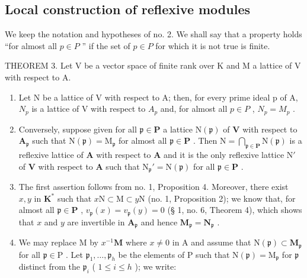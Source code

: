 \subsection{Local construction of reflexive modules}

We keep the notation and hypotheses of no. 2. We shall say that a property holds ``for almost all \(p \in P\) '' if the set of \(p \in P\) for which it is not true is finite.

THEOREM 3. Let V be a vector space of finite rank over K and M a lattice of V with respect to A.

\begin{enumerate}
\def\labelenumi{(\roman{enumi})}
\item
  Let N be a lattice of V with respect to A; then, for every prime ideal p of A, \(N_{p}\) is a lattice of V with respect to \(A_{p}\) and, for almost all \(p \in P\) , \(N_{p} = M_{p}\) .
\item
  Conversely, suppose given for all \(\mathfrak{p} \in \mathbf{P}\) a lattice \(\mathrm{N}(\mathfrak{p})\) of \(\mathbf{V}\) with respect to \(\mathbf{A}_{\mathfrak{p}}\) such that \(\mathrm{N}(\mathfrak{p}) = \mathrm{M}_{\mathfrak{p}}\) for almost all \(\mathfrak{p} \in \mathbf{P}\) . Then \(\mathrm{N} = \bigcap_{\mathfrak{p} \in \mathbf{P}} \mathrm{N}(\mathfrak{p})\) is a reflexive lattice of \(\mathbf{A}\) with respect to \(\mathbf{A}\) and it is the only reflexive lattice \(\mathrm{N}'\) of \(\mathbf{V}\) with respect to \(\mathbf{A}\) such that \(\mathrm{N}_{\mathfrak{p}}' = \mathrm{N}(\mathfrak{p})\) for all \(\mathfrak{p} \in \mathbf{P}\) .
\item
  The first assertion follows from no. 1, Proposition 4. Moreover, there exist \(x, y\) in \(\mathbf{K}^*\) such that \(x\mathrm{N} \subset \mathrm{M} \subset y\mathrm{N}\) (no. 1, Proposition 2); we know that, for almost all \(\mathfrak{p} \in \mathbf{P}\) , \(v_{\mathfrak{p}}(x) = v_{\mathfrak{p}}(y) = 0\) (§ 1, no. 6, Theorem 4), which shows that \(x\) and \(y\) are invertible in \(\mathbf{A}_{\mathfrak{p}}\) and hence \(\mathbf{M}_{\mathfrak{p}} = \mathbf{N}_{\mathfrak{p}}\) .
\item
  We may replace M by \(x^{-1}\mathbf{M}\) where \(x \neq 0\) in A and assume that \(\mathrm{N}(\mathfrak{p}) \subset \mathbf{M}_{\mathfrak{p}}\) for all \(\mathfrak{p} \in \mathrm{P}\) . Let \(\mathfrak{p}_1, \ldots, \mathfrak{p}_h\) be the elements of P such that \(\mathrm{N}(\mathfrak{p}) = \mathrm{M}_{\mathfrak{p}}\) for \(\mathfrak{p}\) distinct from the \(\mathfrak{p}_i\) ( \(1 \leqslant i \leqslant h\) ); we write:
\end{enumerate}

